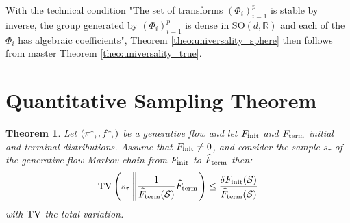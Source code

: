 \documentclass{article}
\theoremstyle{plain}
\newtheorem{theorem}{Theorem}[section]
\theoremstyle{definition}
\theoremstyle{remark}
\theoremstyle{fact}
\begin{document}
 With the technical condition "The set of transforms $(\Phi_i)_{i=1}^p$ is stable by inverse, the group generated by $(\Phi_i)_{i=1}^p$ is dense in $\mathrm{SO}(d,\mathbb R)$ and each of the $\Phi_i$ has algebraic coefficients", Theorem \ref{theo:universality_sphere} then follows from master Theorem \ref{theo:universality_true}.






\section{Quantitative Sampling Theorem}
\begin{theorem}
\label{theo:negative_control_appendix}
  Let $(\pi_{\rightarrow}^*, f^*_{\rightarrow})$ be a generative flow and let $F_{\mathrm{init}}$ and $F_{\mathrm{term}}$ initial and terminal distributions. Assume that $F_{\mathrm{init}}\neq 0$, and consider the sample $s_\tau$ of the generative flow Markov chain from $F_{\mathrm{init}}$ to $\widehat{F}_{\mathrm{term}}$ then:
    \begin{equation}
        \mathrm{TV}\left(s_\tau \left\| \frac{1}{\widehat{F}_{\mathrm{term}}(\mathcal S )} \widehat{F}_{\mathrm{term}}\right.\right) \leq  \frac{\delta F_{\mathrm{init}}(\mathcal S)}{\widehat{F}_{\mathrm{term}}(\mathcal S)}
    \end{equation}
    with $\mathrm{TV}$  the total variation.
\end{theorem}
\end{document}
